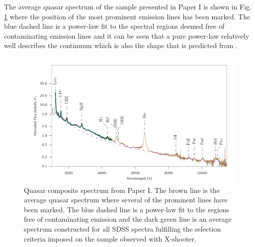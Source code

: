 The average quasar spectrum of the sample presented in Paper I is shown in Fig.
\ref{fig:intro:qsospec} where the position of the most prominent emission lines
has been marked. The blue dashed line is a power-law fit to the spectral regions
deemed free of contaminating emission lines and it can be seen that a pure
power-law relatively well describes the continuum which is also the shape that
is predicted from \citep{Pereyra2006}.

\begin{figure}[htb]
	\includegraphics[width=\textwidth]{gfx/qsospec}
	\caption{Quasar composite spectrum from Paper I. The brown line is the average
quasar spectrum where several of the prominent lines have been marked. The blue
dashed line is a power-law fit to the regions free of contaminating emission and
 the dark green line is an average spectrum constructed for all SDSS spectra
fulfilling the selection criteria imposed on the sample observed with
X-shooter.}
	\label{fig:intro:qsospec}
\end{figure}



